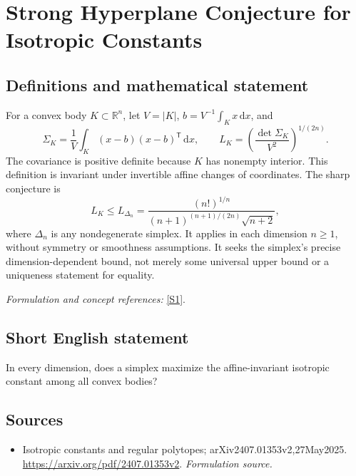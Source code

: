 \documentclass[11pt]{article}
\begin{document}
\section*{\texorpdfstring{Strong Hyperplane Conjecture for Isotropic Constants}{Strong Hyperplane Conjecture for Isotropic Constants}}\label{30006882}
\subsection{Definitions and mathematical statement}
For a convex body $K\subset{\mathbb{R}}^n$, let $V=|K|$, $b=V^{-1}\int_Kx{\,\mathrm{d}} x$, and
\[
 \Sigma_K=\frac1V\int_K(x-b)(x-b)^{\mathsf T}{\,\mathrm{d}} x,
 \qquad L_K=\left(\frac{\det\Sigma_K}{V^2}\right)^{1/(2n)}.
\]
The covariance is positive definite because $K$ has nonempty interior. This definition is invariant under invertible affine changes of coordinates. The sharp conjecture is
\[
 L_K\le L_{\Delta_n}
 =\frac{(n!)^{1/n}}{(n+1)^{(n+1)/(2n)}\sqrt{n+2}},
\]
where $\Delta_n$ is any nondegenerate simplex. It applies in each dimension $n\ge1$, without symmetry or smoothness assumptions. It seeks the simplex's precise dimension-dependent bound, not merely some universal upper bound or a uniqueness statement for equality.
\par\smallskip\textit{Formulation and concept references:} \href{https://arxiv.org/pdf/2407.01353v2}{[S1]}.

\subsection{Short English statement}
In every dimension, does a simplex maximize the affine-invariant isotropic constant among all convex bodies?
\subsection{Sources}
\begin{itemize}
\item[S1]Isotropic constants and regular polytopes; arXiv2407.01353v2,27May2025.
\url{https://arxiv.org/pdf/2407.01353v2}.
\textit{Formulation source.}
\end{itemize}
\end{document}
